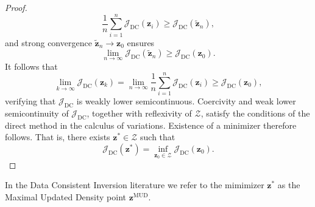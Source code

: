 \documentclass[final,1p,times]{elsarticle}
\begin{document}
\begin{proof}
\begin{equation}
\frac{1}{n} \sum_{i=1}^n \mathcal{J}_{\mathrm{DC}}(\mathbf{z}_i) \geq \mathcal{J}_{\mathrm{DC}}(\tilde{\mathbf{z}}_n),
\end{equation}
and strong convergence $ \tilde{\mathbf{z}}_n \to \mathbf{z}_0 $ ensures
\begin{equation}
\lim_{n \to \infty} \mathcal{J}_{\mathrm{DC}}(\tilde{\mathbf{z}}_n) \geq \mathcal{J}_{\mathrm{DC}}(\mathbf{z}_0).
\end{equation}
It follows that
\begin{equation}
\lim_{k \to \infty} \mathcal{J}_{\mathrm{DC}}(\mathbf{z}_k) = \lim_{n \to \infty} \frac{1}{n} \sum_{i=1}^n \mathcal{J}_{\mathrm{DC}}(\mathbf{z}_i) \geq \mathcal{J}_{\mathrm{DC}}(\mathbf{z}_0),
\end{equation}
verifying that $ \mathcal{J}_{\mathrm{DC}} $ is weakly lower semicontinuous. Coercivity and weak lower semicontinuity of $ \mathcal{J}_{\mathrm{DC}} $, together with reflexivity of $ \mathcal{Z} $, satisfy the conditions of the direct method in the calculus of variations. Existence of a minimizer therefore follows. That is, there exists $ \mathbf{z}^* \in \mathcal{Z} $ such that
\begin{equation}
\mathcal{J}_{\mathrm{DC}}(\mathbf{z}^*) = \inf_{\mathbf{z}_0 \in \mathcal{Z}} \mathcal{J}_{\mathrm{DC}}(\mathbf{z}_0).
\end{equation}
\end{proof}
\noindent In the Data Consistent Inversion literature we refer to the mimimizer $\mathbf{z}^*$ as the Maximal Updated Density point $\mathbf{z}^{\mathrm{MUD}}$.
\end{document}
